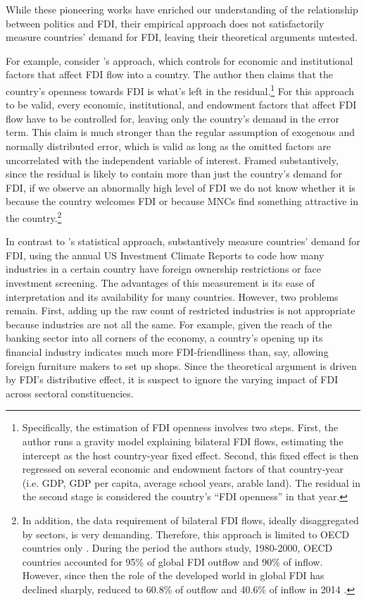 While these pioneering works have enriched our understanding of the relationship between politics and FDI, their empirical approach does not satisfactorily measure countries' demand for FDI, leaving their theoretical arguments untested.

For example, consider \citet{Pinto2013}'s approach, which controls for economic and institutional factors that affect FDI flow into a country. The author then claims that the country's openness towards FDI is what's left in the residual.\footnote{Specifically, the estimation of FDI openness involves two steps. First, the author runs a gravity model explaining bilateral FDI flows, estimating the intercept as the host country-year fixed effect. Second, this fixed effect is then regressed on several economic and endowment factors of that country-year (i.e. GDP, GDP per capita, average school years, arable land). The residual in the second stage is considered the country's ``FDI openness'' in that year.} For this approach to be valid, every economic, institutional, and endowment factors that affect FDI flow have to be controlled for, leaving only the country's demand in the error term. This claim is much stronger than the regular assumption of exogenous and normally distributed error, which is valid as long as the omitted factors are uncorrelated with the independent variable of interest. Framed substantively, since the residual is likely to contain more than just the country's demand for FDI, if we observe an abnormally high level of FDI we do not know whether it is because the country welcomes FDI or because MNCs find something attractive in the country.\footnote{In addition, the data requirement of bilateral FDI flows, ideally disaggregated by sectors, is very demanding. Therefore, this approach is limited to OECD countries only \citep{Pinto2008}. During the period the authors study, 1980-2000, OECD countries accounted for 95\% of global FDI outflow and 90\% of inflow. However, since then the role of the developed world in global FDI has declined sharply, reduced to 60.8\% of outflow and 40.6\% of inflow in 2014 \citep{UNCTAD2015}.}

In contrast to \citet{Pinto2013}'s statistical approach, \citet{Pandya2014, Pandya2016} substantively measure countries' demand for FDI, using the annual US Investment Climate Reports to code how many industries in a certain country have foreign ownership restrictions or face investment screening. The advantages of this measurement is its ease of interpretation and its availability for many countries. However, two problems remain. First, adding up the raw count of restricted industries is not appropriate because industries are not all the same. For example, given the reach of the banking sector into all corners of the economy, a country's opening up its financial industry indicates much more FDI-friendliness than, say, allowing foreign furniture makers to set up shops. Since the theoretical argument is driven by FDI's distributive effect, it is suspect to ignore the varying impact of FDI across sectoral constituencies. 

